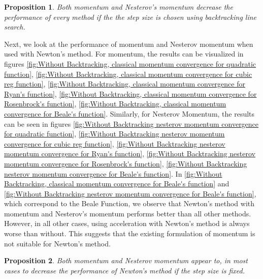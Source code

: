 \documentclass{article}
\newtheorem{prop}{Proposition}
\begin{document}
\begin{prop}
	Both momentum and Nesterov's momentum decrease the performance of every method if the the step size is chosen using backtracking line search.
\end{prop}

Next, we look at the performance of momentum and Nesterov momentum when used with Newton's method. For momentum, the results can be visualized in figures \ref{fig:Without Backtracking, classical momentum convergence for quadratic function},
\ref{fig:Without Backtracking, classical momentum convergence for cubic reg function},
\ref{fig:Without Backtracking, classical momentum convergence for Ryan's function},
\ref{fig:Without Backtracking, classical momentum convergence for Rosenbrock's function},
\ref{fig:Without Backtracking, classical momentum convergence for Beale's function}. Similarly, for Nesterov Momentum, the results can be seen in figures \ref{fig:Without Backtracking nesterov momentum convergence for quadratic function},
\ref{fig:Without Backtracking nesterov momentum convergence for cubic reg function},
\ref{fig:Without Backtracking nesterov momentum convergence for Ryan's function},
\ref{fig:Without Backtracking nesterov momentum convergence for Rosenbrock's function},
\ref{fig:Without Backtracking nesterov momentum convergence for Beale's function}. In \ref{fig:Without Backtracking, classical momentum convergence for Beale's function} and \ref{fig:Without Backtracking nesterov momentum convergence for Beale's function}, which correspond to the Beale Function, we observe that Newton's method with momentum and Nesterov's momentum performs better than all other methods. However, in all other cases, using acceleration with Newton's method is always worse than without. This suggests that the existing formulation of momentum is not suitable for Newton's method.

\begin{prop}
	Both momentum and Nesterov momentum appear to, in most cases to decrease the performance of Newton's method if the step size is fixed. 
\end{prop}
\end{document}
